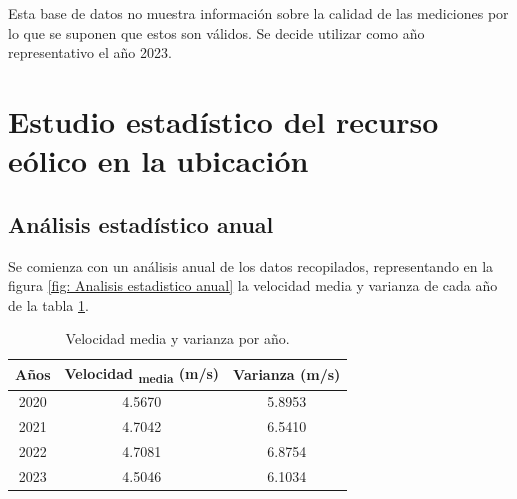 \documentclass{IEEEtran}
\begin{document}
Esta base de datos no muestra información sobre la calidad de las mediciones por lo que se suponen que estos son válidos. Se decide utilizar como año representativo el año 2023.


\section{Estudio estadístico del recurso eólico en la ubicación}


\subsection{Análisis estadístico anual}

Se comienza con un análisis anual de los datos recopilados, representando en la figura \ref{fig: Analisis estadistico anual} la velocidad media y varianza de cada año de la tabla \ref{tab: Velocidad media y varianza por año}.

\begin{table}[h]
    \centering
    \label{tab: Velocidad media y varianza por año}
    \caption{Velocidad media y varianza por año.}
    \begin{tabular}{|c|c|c|}
        \hline
        Años & Velocidad \textsubscript{media} (m/s) & Varianza (m/s) \\
        \hline
        2020 & 4.5670 & 5.8953 \\
        2021 & 4.7042 & 6.5410 \\
        2022 & 4.7081 & 6.8754 \\
        2023 & 4.5046 & 6.1034 \\
        \hline
    \end{tabular}
\end{table}
\end{document}
